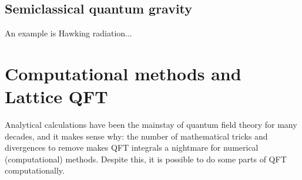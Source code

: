 \subsection{Semiclassical quantum gravity}

An example is Hawking radiation...

\section{Computational methods and Lattice QFT}

Analytical calculations have been the mainstay of quantum field theory for many decades, and it makes sense why: the number of mathematical tricks and divergences to remove makes QFT integrals a nightmare for numerical (computational) methods. Despite this, it is possible to do some parts of QFT computationally.
